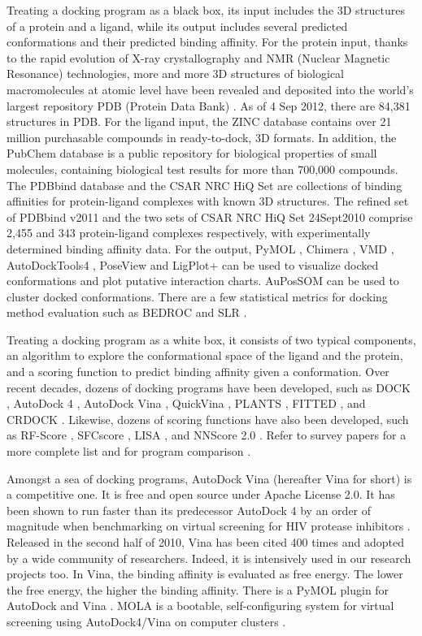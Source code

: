 Treating a docking program as a black box, its input includes the 3D structures of a protein and a ligand, while its output includes several predicted conformations and their predicted binding affinity. For the protein input, thanks to the rapid evolution of X-ray crystallography and NMR (Nuclear Magnetic Resonance) technologies, more and more 3D structures of biological macromolecules at atomic level have been revealed and deposited into the world's largest repository PDB (Protein Data Bank) \citep{540,537}. As of 4 Sep 2012, there are 84,381 structures in PDB. For the ligand input, the ZINC database \citep{532,1178} contains over 21 million purchasable compounds in ready-to-dock, 3D formats. In addition, the PubChem database \citep{526} is a public repository for biological properties of small molecules, containing biological test results for more than 700,000 compounds. The PDBbind database \citep{529,530} and the CSAR NRC HiQ Set \citep{857,960} are collections of binding affinities for protein-ligand complexes with known 3D structures. The refined set of PDBbind v2011 and the two sets of CSAR NRC HiQ Set 24Sept2010 comprise 2,455 and 343 protein-ligand complexes respectively, with experimentally determined binding affinity data. For the output, PyMOL \citep{1221}, Chimera \citep{1219}, VMD \citep{1220}, AutoDockTools4 \citep{596}, PoseView \citep{748} and LigPlot+ \citep{951} can be used to visualize docked conformations and plot putative interaction charts. AuPosSOM \citep{598} can be used to cluster docked conformations. There are a few statistical metrics for docking method evaluation such as BEDROC \citep{490} and SLR \citep{489}.

Treating a docking program as a white box, it consists of two typical components, an algorithm to explore the conformational space of the ligand and the protein, and a scoring function to predict binding affinity given a conformation. Over recent decades, dozens of docking programs have been developed, such as DOCK \citep{1222}, AutoDock 4 \citep{596}, AutoDock Vina \citep{595}, QuickVina \citep{1193}, PLANTS \citep{610,607}, FITTED \citep{602}, and CRDOCK \citep{1200}. Likewise, dozens of scoring functions have also been developed, such as RF-Score \citep{564}, SFCscore \citep{581}, LISA \citep{775}, and NNScore 2.0 \citep{977}. Refer to survey papers for a more complete list \citep{493,922} and for program comparison \citep{556,637}.

Amongst a sea of docking programs, AutoDock Vina \citep{595} (hereafter Vina for short) is a competitive one. It is free and open source under Apache License 2.0. It has been shown to run faster than its predecessor AutoDock 4 \citep{596} by an order of magnitude when benchmarking on virtual screening for HIV protease inhibitors \citep{556}. Released in the second half of 2010, Vina has been cited 400 times and adopted by a wide community of researchers. Indeed, it is intensively used in our research projects too. In Vina, the binding affinity is evaluated as free energy. The lower the free energy, the higher the binding affinity. There is a PyMOL plugin for AutoDock and Vina \citep{609}. MOLA is a bootable, self-configuring system for virtual screening using AutoDock4/Vina on computer clusters \citep{773}.

